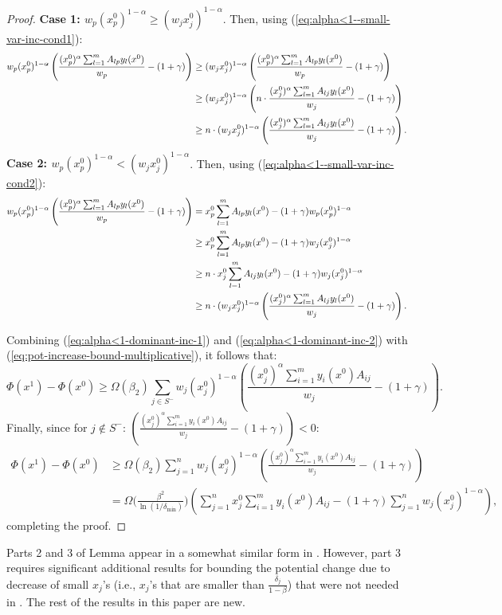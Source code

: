 \documentclass[11pt]{article}
\begin{document}
\begin{proof}
\noindent\textbf{Case 1: $w_p (x_p^0)^{1-\alpha} \geq (w_j x_j^0)^{1-\alpha}$}. Then, using (\ref{eq:alpha<1--small-var-inc-cond1}):
\begin{align}
w_p (x_p^0)^{1-\alpha}\left(\frac{(x_p^0)^{\alpha}\sum_{l=1}^m A_{lp}y_l(x^0) }{w_p} -(1+\gamma)\right)&\geq (w_j x_j^0)^{1-\alpha}\left(\frac{(x_p^0)^{\alpha}\sum_{l=1}^m A_{lp}y_l(x^0) }{w_p} -(1+\gamma)\right)\notag\\
& \geq (w_j x_j^0)^{1-\alpha}\left(n\cdot\frac{(x_j^0)^{\alpha}\sum_{l=1}^m A_{lj}y_l(x^0) }{w_j} -(1+\gamma)\right)\notag\\
&\geq n\cdot (w_j x_j^0)^{1-\alpha}\left(\frac{(x_j^0)^{\alpha}\sum_{l=1}^m A_{lj}y_l(x^0) }{w_j} -(1+\gamma)\right). \label{eq:alpha<1-dominant-inc-1}
\end{align}
\noindent\textbf{Case 2: $w_p (x_p^0)^{1-\alpha} < (w_j x_j^0)^{1-\alpha}$}. Then, using (\ref{eq:alpha<1--small-var-inc-cond2}):
\begin{align}
w_p (x_p^0)^{1-\alpha}\left(\frac{(x_p^0)^{\alpha}\sum_{l=1}^m A_{lp}y_l(x^0) }{w_p} -(1+\gamma)\right)&= x_p^0\sum_{l=1}^m A_{lp}y_l(x^0) - (1+\gamma)w_p (x_p^0)^{1-\alpha}\notag\\
&\geq x_p^0\sum_{l=1}^m A_{lp}y_l(x^0) - (1+\gamma)w_j (x_j^0)^{1-\alpha}\notag\\
&\geq n\cdot x_j^0\sum_{l=1}^m A_{lj}y_l(x^0) - (1+\gamma)w_j (x_j^0)^{1-\alpha}\notag\\
&\geq n\cdot (w_j x_j^0)^{1-\alpha}\left(\frac{(x_j^0)^{\alpha}\sum_{l=1}^m A_{lj}y_l(x^0) }{w_j} -(1+\gamma)\right). \label{eq:alpha<1-dominant-inc-2}
\end{align}

Combining (\ref{eq:alpha<1-dominant-inc-1}) and (\ref{eq:alpha<1-dominant-inc-2}) with (\ref{eq:pot-increase-bound-multiplicative}), it follows that:
\begin{equation*}
\Phi(x^1) - \Phi(x^0) \geq \Omega(\beta_2)\sum_{j\in S^-} w_j (x_j^0)^{1-\alpha}\left(\frac{(x_j^0)^{\alpha}\sum_{i=1}^my_i(x^0)A_{ij}}{w_j}- (1+\gamma)\right).
\end{equation*}
Finally, since for $j\notin S^-$: $\left(\frac{(x_j^0)^{\alpha}\sum_{i=1}^my_i(x^0)A_{ij}}{w_j}- (1+\gamma)\right) < 0$:
\begin{align*}
\Phi(x^1) - \Phi(x^0) &\geq \Omega(\beta_2)\sum_{j=1}^n w_j (x_j^0)^{1-\alpha}\left(\frac{(x_j^0)^{\alpha}\sum_{i=1}^my_i(x^0)A_{ij}}{w_j}- (1+\gamma)\right)\\
&= \Omega\Big(\frac{\beta^2}{\ln(1/\delta_{\min})}\Big)\left(\sum_{j=1}^nx_j^0\sum_{i=1}^my_i(x^0)A_{ij} - (1+\gamma)\sum_{j=1}^n w_j (x_j^0)^{1-\alpha}\right),
\end{align*}
completing the proof.
\end{proof}
Parts 2 and 3 of Lemma \cite{AwerbuchKhandekar2009} appear in a somewhat similar form in \cite{AwerbuchKhandekar2009}. However, part 3 requires significant additional results for bounding the potential change due to decrease of small $x_j$'s (i.e., $x_j$'s that are smaller than $\frac{\delta_j}{1-\beta}$) that were not needed in \cite{AwerbuchKhandekar2009}. The rest of the results in this paper are new.    
\end{document}
